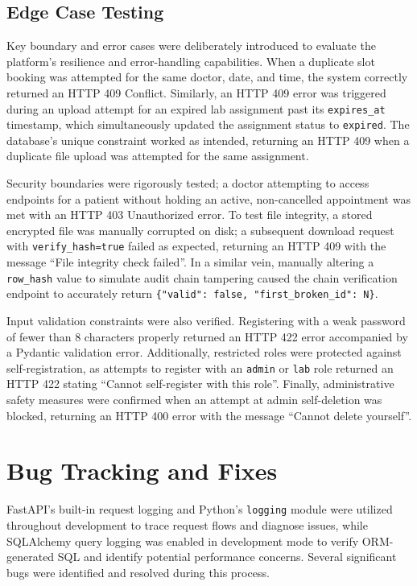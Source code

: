 \documentclass[a4paper,12pt]{report}
\begin{document}
\subsection{Edge Case Testing}
Key boundary and error cases were deliberately introduced to evaluate the platform’s resilience and error-handling capabilities. When a duplicate slot booking was attempted for the same doctor, date, and time, the system correctly returned an HTTP 409 Conflict. Similarly, an HTTP 409 error was triggered during an upload attempt for an expired lab assignment past its \texttt{expires\_at} timestamp, which simultaneously updated the assignment status to \texttt{expired}. The database's unique constraint worked as intended, returning an HTTP 409 when a duplicate file upload was attempted for the same assignment. 

Security boundaries were rigorously tested; a doctor attempting to access endpoints for a patient without holding an active, non-cancelled appointment was met with an HTTP 403 Unauthorized error. To test file integrity, a stored encrypted file was manually corrupted on disk; a subsequent download request with \texttt{verify\_hash=true} failed as expected, returning an HTTP 409 with the message ``File integrity check failed''. In a similar vein, manually altering a \texttt{row\_hash} value to simulate audit chain tampering caused the chain verification endpoint to accurately return \texttt{\{"valid": false, "first\_broken\_id": N\}}. 

Input validation constraints were also verified. Registering with a weak password of fewer than 8 characters properly returned an HTTP 422 error accompanied by a Pydantic validation error. Additionally, restricted roles were protected against self-registration, as attempts to register with an \texttt{admin} or \texttt{lab} role returned an HTTP 422 stating ``Cannot self-register with this role''. Finally, administrative safety measures were confirmed when an attempt at admin self-deletion was blocked, returning an HTTP 400 error with the message ``Cannot delete yourself''.

\section{Bug Tracking and Fixes}

FastAPI's built-in request logging and Python's \texttt{logging} module were utilized throughout development to trace request flows and diagnose issues, while SQLAlchemy query logging was enabled in development mode to verify ORM-generated SQL and identify potential performance concerns. Several significant bugs were identified and resolved during this process. 
\end{document}
